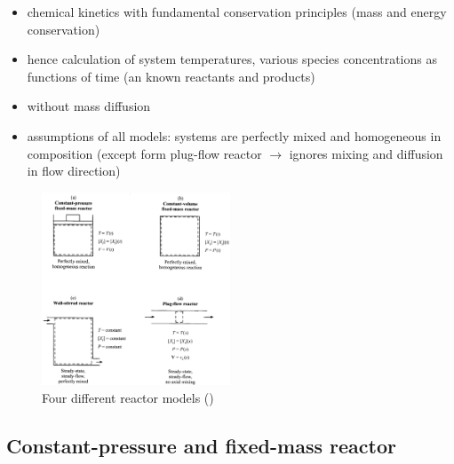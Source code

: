 \documentclass[12pt,oneside,a4paper,english]{article}
\begin{document}
\begin{itemize}
\item {chemical kinetics with fundamental conservation principles (mass and energy conservation)}
\item {hence calculation of system temperatures, various species concentrations as functions of time (an known reactants and products)}
\item {without mass diffusion}
\item {assumptions of all models: systems are perfectly mixed and homogeneous in composition (except form plug-flow reactor $\rightarrow$ ignores mixing and diffusion in flow direction)}
\end{itemize}

\begin{figure}[H]
\centering
\includegraphics[width=0.5\textwidth]{models}
\caption{Four different reactor models (\cite{turns2012introduction})}
\label{fig:reactors}
\end{figure}


\subsection{Constant-pressure and fixed-mass reactor} %
\end{document}
